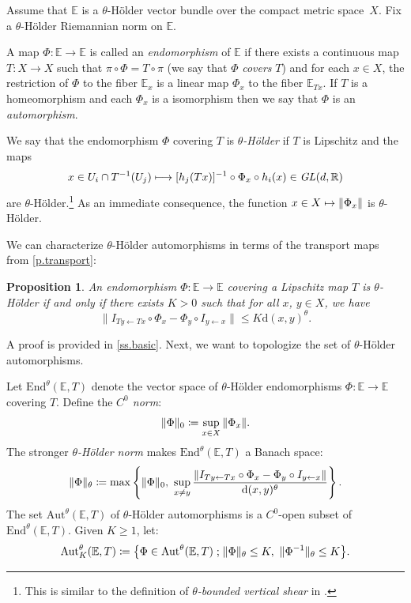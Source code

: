 \documentclass[10pt]{amsart}
\def\vcentcolon{\mathrel{\mathop\ordinarycolon}}
\providecommand\ordinarycolon{:}
\providecommand*\coloneqq{\vcentcolon\mathrel{\mkern-1.2mu}=}
\newcommand\mto{\mathchoice{\longmapsto}{\mapsto}{\mapsto}{\mapsto}}
\theoremstyle{plain}
\newtheorem{proposition}[theorem]{Proposition}
\theoremstyle{definition}
\newcommand{\RR}{\mathbb{R}}
\newcommand{\EE}{\mathbb{E}}
\newcommand{\st}{\;\mathord{;}\;}
\newcommand{\GL}{\mathit{GL}}
\newcommand{\dd}{\mathrm{d}}
\newcommand{\Aut}{\mathrm{Aut}}
\newcommand{\End}{\mathrm{End}}
\begin{document}
Assume that $\EE$ is a $\theta$-Hölder vector bundle over the compact metric space~$X$.
Fix a $\theta$-Hölder Riemannian norm on $\EE$.

A map $\Phi \colon \EE \to \EE$ is called an \emph{endomorphism} of $\EE$ if
there exists a continuous map $T \colon X \to X$ such that $\pi \circ \Phi = T \circ \pi$
(we say that $\Phi$ \emph{covers} $T$) and for each $x \in X$, the restriction of $\Phi$ to the fiber $\EE_x$ is a linear map $\Phi_x$ to the fiber $\EE_{Tx}$. If $T$ is a homeomorphism and each $\Phi_x$ is a isomorphism then we say that $\Phi$ is an \emph{automorphism}.

We say that the endomorphism $\Phi$ covering $T$ is \emph{$\theta$-Hölder} if $T$ is Lipschitz and the maps
\[
x \in U_i \cap T^{-1}(U_j) \mto [h_j(Tx)]^{-1} \circ \Phi_x \circ h_i(x) \in \GL(d,\RR)
\]
are $\theta$-Hölder.\footnote{This is similar to the definition of \emph{$\theta$-bounded vertical shear} in \cite{PSW2}.}
As an immediate consequence, the function $x \in X \mto \|\Phi_x\|$ is $\theta$\nobreakdash-Hölder.

We can characterize $\theta$-Hölder automorphisms in terms of the transport maps from \cref{p.transport}:
\begin{proposition}\label{p.endo_Holder}
An endomorphism $\Phi \colon \EE \to \EE$ covering a Lipschitz map $T$ is $\theta$-Hölder if and only if there exists $K>0$ such that for all
$x$, $y \in X$, we have
\[
\big\| I_{Ty \gets Tx} \circ \Phi_x - \Phi_y \circ I_{y \gets x} \big\| \le K \dd(x,y)^\theta.
\]
\end{proposition}

A proof is provided in \cref{ss.basic}. Next, we want to topologize the set of $\theta$\nobreakdash-Hölder automorphisms.

Let $\End^\theta(\EE,T)$ denote the vector space of $\theta$-Hölder endomorphisms $\Phi \colon \EE \to \EE$ covering $T$.
Define the \emph{$C^0$ norm}:
\begin{equation}\label{e.C0_norm}
\|\Phi\|_0 \coloneqq \sup_{x \in X} \|\Phi_x\|.
\end{equation}
The stronger \emph{$\theta$-Hölder norm} makes $\End^\theta(\EE,T)$ a Banach space:
\begin{equation}\label{e.Holder_norm}
\|\Phi\|_\theta \coloneqq \max \left\{ \|\Phi\|_0, \ \sup_{x \neq y} \frac{\|I_{Ty \gets Tx} \circ \Phi_x - \Phi_y \circ I_{y \gets x}\|}{\dd(x,y)^\theta} \right\}.
\end{equation}
The set $\Aut^\theta(\EE,T)$ of $\theta$-Hölder automorphisms is a $C^0$-open subset of $\End^\theta(\EE,T)$.
Given $K\ge 1$, let:
\begin{equation}\label{e.bounded_set}
\Aut^\theta_K(\EE,T) \coloneqq \big\{ \Phi \in \Aut^\theta(\EE,T) \st \|\Phi\|_\theta \le K, \ \|\Phi^{-1}\|_\theta \le K \big\}.
\end{equation}
\end{document}
